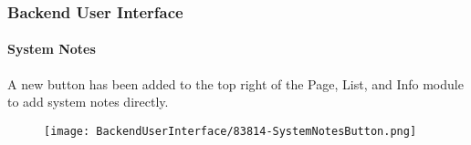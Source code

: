 %

\begin{frame}[fragile]
	\frametitle{Backend User Interface}
	\framesubtitle{System Notes}

	A new button has been added to the top right of the Page, List, and Info module
	to add system notes directly.

	\begin{figure}
		\texttt{[image: BackendUserInterface/83814-SystemNotesButton.png]}
	\end{figure}

\end{frame}

